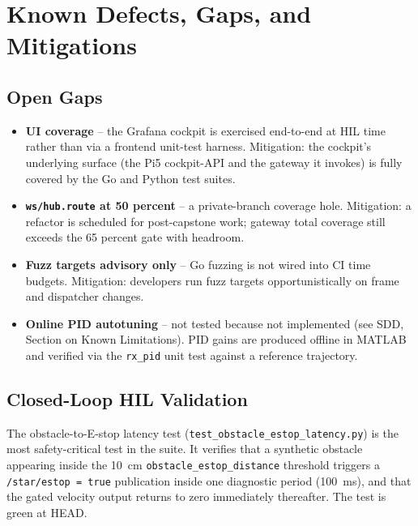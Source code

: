 \documentclass[11pt,letterpaper]{article}
\begin{document}
\section{Known Defects, Gaps, and Mitigations}
\label{sec:defects}

\subsection{Open Gaps}
\begin{itemize}[leftmargin=1.4em,itemsep=2pt]
\item \textbf{UI coverage} -- the Grafana cockpit is exercised
      end-to-end at HIL time rather than via a frontend unit-test
      harness. Mitigation: the cockpit's underlying surface (the
      Pi5 cockpit-API and the gateway it invokes) is fully covered
      by the Go and Python test suites.
\item \textbf{\texttt{ws/hub.route} at 50 percent} -- a private-branch
      coverage hole. Mitigation: a refactor is scheduled for
      post-capstone work; gateway total coverage still exceeds the
      65 percent gate
      with headroom.
\item \textbf{Fuzz targets advisory only} -- Go fuzzing is not
      wired into CI time budgets. Mitigation: developers run fuzz
      targets opportunistically on frame and dispatcher changes.
\item \textbf{Online PID autotuning} -- not tested because not
      implemented (see SDD, Section on Known Limitations). PID
      gains are produced offline in MATLAB and verified via the
      \texttt{rx\_pid} unit test against a reference trajectory.
\end{itemize}

\subsection{Closed-Loop HIL Validation}
The obstacle-to-E-stop latency test
(\texttt{test\_obstacle\_estop\_latency.py}) is the most
safety-critical test in the suite. It verifies that a synthetic
obstacle appearing inside the \qty{10}{\centi\meter}
\texttt{obstacle\_estop\_distance} threshold triggers a
\texttt{/star/estop = true} publication inside one diagnostic
period (\qty{100}{\milli\second}), and that the gated velocity
output returns to zero immediately thereafter. The test is green
at HEAD.
\end{document}
